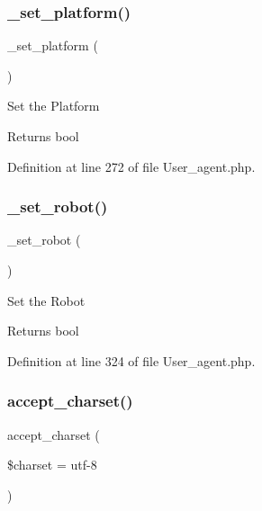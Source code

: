 \subsubsection{\texorpdfstring{\_set\_platform()}{\_set\_platform()}}
{\footnotesize\ttfamily \+\_\+set\+\_\+platform (\begin{DoxyParamCaption}{ }\end{DoxyParamCaption})\hspace{0.3cm}{\ttfamily [protected]}}

Set the Platform

\begin{DoxyReturn}{Returns}
bool 
\end{DoxyReturn}


Definition at line 272 of file User\+\_\+agent.\+php.

\mbox{\label{class_c_i___user__agent_a037f28a8a54578f57417d15fae820817}} 
\subsubsection{\texorpdfstring{\_set\_robot()}{\_set\_robot()}}
{\footnotesize\ttfamily \+\_\+set\+\_\+robot (\begin{DoxyParamCaption}{ }\end{DoxyParamCaption})\hspace{0.3cm}{\ttfamily [protected]}}

Set the Robot

\begin{DoxyReturn}{Returns}
bool 
\end{DoxyReturn}


Definition at line 324 of file User\+\_\+agent.\+php.

\mbox{\label{class_c_i___user__agent_adc1f6218ec74ef1686ae6cb1218be7b1}} 
\subsubsection{\texorpdfstring{accept\_charset()}{accept\_charset()}}
{\footnotesize\ttfamily accept\+\_\+charset (\begin{DoxyParamCaption}\item[{}]{\$charset = {\ttfamily \textquotesingle{}utf-\/8\textquotesingle{}} }\end{DoxyParamCaption})}

